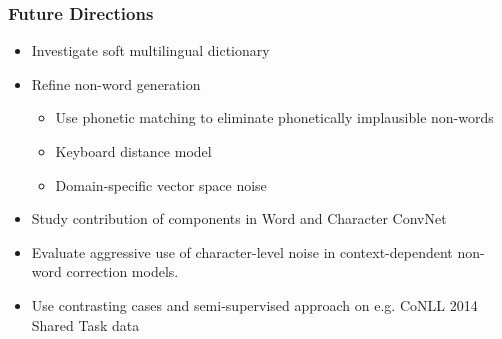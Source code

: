 \begin{frame}
\frametitle{Future Directions}
\begin{itemize}
    \item Investigate soft multilingual dictionary
    \item Refine non-word generation 
        \begin{itemize}
        \item Use phonetic matching to eliminate phonetically implausible non-words
        \item Keyboard distance model
        \item Domain-specific vector space noise
        \end{itemize}
    \item Study contribution of components in Word and Character ConvNet 
    \item Evaluate aggressive use of character-level noise in context-dependent non-word correction models.
    \item Use contrasting cases and semi-supervised approach on e.g. CoNLL 2014 Shared Task data
\end{itemize}
\end{frame}